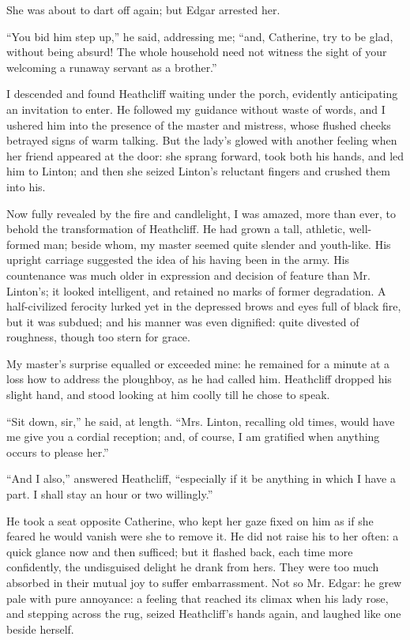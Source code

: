 \par She was about to dart off again; but Edgar arrested her.
\par “You bid him step up,” he said, addressing me; “and, Catherine, try to be glad, without being absurd! The whole household need not witness the sight of your welcoming a runaway servant as a brother.”
\par I descended and found Heathcliff waiting under the porch, evidently anticipating an invitation to enter. He followed my guidance without waste of words, and I ushered him into the presence of the master and mistress, whose flushed cheeks betrayed signs of warm talking. But the lady's glowed with another feeling when her friend appeared at the door: she sprang forward, took both his hands, and led him to Linton; and then she seized Linton's reluctant fingers and crushed them into his.
\par Now fully revealed by the fire and candlelight, I was amazed, more than ever, to behold the transformation of Heathcliff. He had grown a tall, athletic, well-formed man; beside whom, my master seemed quite slender and youth-like. His upright carriage suggested the idea of his having been in the army. His countenance was much older in expression and decision of feature than Mr. Linton's; it looked intelligent, and retained no marks of former degradation. A half-civilized ferocity lurked yet in the depressed brows and eyes full of black fire, but it was subdued; and his manner was even dignified: quite divested of roughness, though too stern for grace.
\par My master's surprise equalled or exceeded mine: he remained for a minute at a loss how to address the ploughboy, as he had called him. Heathcliff dropped his slight hand, and stood looking at him coolly till he chose to speak.
\par “Sit down, sir,” he said, at length. “Mrs. Linton, recalling old times, would have me give you a cordial reception; and, of course, I am gratified when anything occurs to please her.”
\par “And I also,” answered Heathcliff, “especially if it be anything in which I have a part. I shall stay an hour or two willingly.”
\par He took a seat opposite Catherine, who kept her gaze fixed on him as if she feared he would vanish were she to remove it. He did not raise his to her often: a quick glance now and then sufficed; but it flashed back, each time more confidently, the undisguised delight he drank from hers. They were too much absorbed in their mutual joy to suffer embarrassment. Not so Mr. Edgar: he grew pale with pure annoyance: a feeling that reached its climax when his lady rose, and stepping across the rug, seized Heathcliff's hands again, and laughed like one beside herself.
